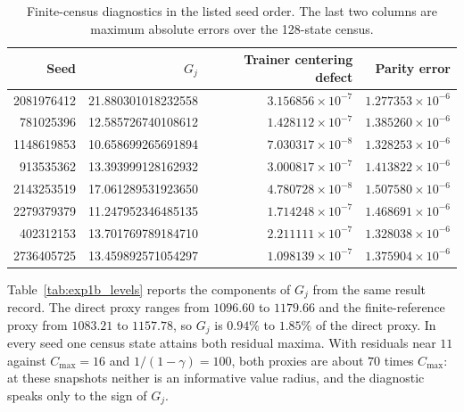 \documentclass{article}
\theoremstyle{plain}
\theoremstyle{definition}
\theoremstyle{remark}
\begin{document}
\begin{table}[htbp]
\caption{Finite-census diagnostics in the listed seed order. The last
two columns are maximum absolute errors over the 128-state census.}
\label{tab:exp1b_run5}
\centering
\small
\setlength{\tabcolsep}{4pt}
\begin{tabular}{@{}rrrr@{}}
\toprule
Seed & $G_j$ & Trainer centering defect & Parity error \\
\midrule
2081976412 & 21.880301018232558 & $3.156856\times10^{-7}$ & $1.277353\times10^{-6}$ \\
781025396  & 12.585726740108612 & $1.428112\times10^{-7}$ & $1.385260\times10^{-6}$ \\
1148619853 & 10.658699265691894 & $7.030317\times10^{-8}$ & $1.328253\times10^{-6}$ \\
913535362  & 13.393999128162932 & $3.000817\times10^{-7}$ & $1.413822\times10^{-6}$ \\
2143253519 & 17.061289531923650 & $4.780728\times10^{-8}$ & $1.507580\times10^{-6}$ \\
2279379379 & 11.247952346485135 & $1.714248\times10^{-7}$ & $1.468691\times10^{-6}$ \\
402312153  & 13.701769789184710 & $2.211111\times10^{-7}$ & $1.328038\times10^{-6}$ \\
2736405725 & 13.459892571054297 & $1.098139\times10^{-7}$ & $1.375904\times10^{-6}$ \\
\bottomrule
\end{tabular}
\end{table}

Table~\ref{tab:exp1b_levels} reports the components of $G_j$ from the same
result record. The direct proxy ranges from $1096.60$ to $1179.66$ and the
finite-reference proxy from $1083.21$ to $1157.78$, so $G_j$ is $0.94\%$ to
$1.85\%$ of the direct proxy. In every seed one census state attains both
residual maxima. With residuals near $11$ against $C_{\max}=16$ and
$1/(1-\gamma)=100$, both proxies are about $70$ times $C_{\max}$: at these
snapshots neither is an informative value radius, and the diagnostic speaks
only to the sign of $G_j$.
\end{document}
